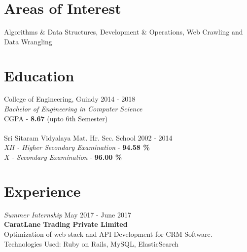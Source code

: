 \documentclass[10pt,a4paper,sans	]{moderncv}        %
\title{}                               %
\begin{document}
\makecvtitle
\section{\LARGE{Areas of Interest}}
\vspace{6pt}
\Large{Algorithms \& Data Structures, Development \& Operations, Web Crawling and Data Wrangling}
\section{\LARGE{Education}}

\vspace{5pt}

\textbf\Large{College of Engineering, Guindy} \hfill 2014 - 2018 \\
\textit{Bachelor of Engineering in Computer Science} \\
CGPA - \textbf{8.67} (upto 6th Semester) \\
\\
\textbf\Large{Sri Sitaram Vidyalaya Mat. Hr. Sec. School} \hfill 2002 - 2014 \\
\textit{XII - Higher Secondary Examination} - \textbf{94.58 \%} \\
\textit{X - Secondary Examination} - {\textbf{96.00 \%}}
\vspace{2pt}
\section{\LARGE{Experience}}
\textit{Summer Internship } \hfill May 2017 - June 2017 \\
\textbf {CaratLane Trading Private Limited} \\
Optimization of web-stack and API Development for CRM Software. \\
Technologies Used: Ruby on Rails, MySQL, ElasticSearch
\end{document}
